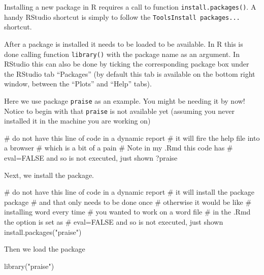 \documentclass[
  letterpaper,
  DIV=11,
  numbers=noendperiod]{scrartcl}
\newenvironment{Shaded}{\begin{snugshade}}{\end{snugshade}}
\newcommand{\CommentTok}[1]{\textcolor[rgb]{0.37,0.37,0.37}{#1}}
\newcommand{\FunctionTok}[1]{\textcolor[rgb]{0.28,0.35,0.67}{#1}}
\newcommand{\NormalTok}[1]{\textcolor[rgb]{0.00,0.23,0.31}{#1}}
\newcommand{\StringTok}[1]{\textcolor[rgb]{0.13,0.47,0.30}{#1}}
\begin{document}
Installing a new package in R requires a call to function
\texttt{install.packages()}. A handy RStudio shortcut is simply to
follow the \texttt{Tools\textbar{}Install\ packages...} shortcut.

After a package is installed it needs to be loaded to be available. In R
this is done calling function \texttt{library()} with the package name
as an argument. In RStudio this can also be done by ticking the
corresponding package box under the RStudio tab ``Packages'' (by default
this tab is available on the bottom right window, between the ``Plots''
and ``Help'' tabs).

Here we use package \texttt{praise} as an example. You might be needing
it by now! Notice to begin with that \texttt{praise} is not available
yet (assuming you never installed it in the machine you are working on)

\begin{Shaded}
\begin{Highlighting}[]
\CommentTok{\# do not have this line of code in a dynamic report}
\CommentTok{\# it will fire the help file into a browser}
\CommentTok{\# which is a bit of a pain}
\CommentTok{\# Note in my .Rmd this code has}
\CommentTok{\# eval=FALSE and so is not executed, just shown}
\NormalTok{?praise}
\end{Highlighting}
\end{Shaded}

Next, we install the package.

\begin{Shaded}
\begin{Highlighting}[]
\CommentTok{\# do not have this line of code in a dynamic report}
\CommentTok{\# it will install the package package}
\CommentTok{\# and that only needs to be done once}
\CommentTok{\# otherwise it would be like}
\CommentTok{\# installing word every time }
\CommentTok{\# you wanted to work on a word file}
\CommentTok{\# in the .Rmd the option is set as}
\CommentTok{\# eval=FALSE and so is not executed, just shown}
\FunctionTok{install.packages}\NormalTok{(}\StringTok{"praise"}\NormalTok{)}
\end{Highlighting}
\end{Shaded}

Then we load the package

\begin{Shaded}
\begin{Highlighting}[]
\FunctionTok{library}\NormalTok{(}\StringTok{"praise"}\NormalTok{)}
\end{Highlighting}
\end{Shaded}
\end{document}
